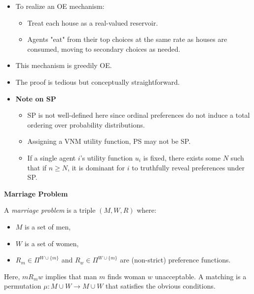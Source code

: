 \documentclass[8pt]{scrartcl}
\renewcommand{\section}[1]{\begin{center}\textbf{\color{red}#1}\end{center}}
\begin{document}
\begin{multicols*}{2}
\begin{itemize}
    \item To realize an OE mechanism:
    \begin{itemize}
        \item Treat each house as a real-valued reservoir.
        \item Agents "eat" from their top choices at the same rate as houses are consumed, moving to secondary choices as needed.
    \end{itemize}
    \item This mechanism is greedily OE.
    \item The proof is tedious but conceptually straightforward.
    \item \textbf{Note on SP}
    \begin{itemize}
        \item SP is not well-defined here since ordinal preferences do not induce a total ordering over probability distributions.
        \item Assigning a VNM utility function, PS may not be SP.
        \item If a single agent $i$'s utility function $u_i$ is fixed, there exists some $N$ such that if $n\geq N$, it is dominant for $i$ to truthfully reveal preferences under SP.
    \end{itemize}
\end{itemize}

\section{Marriage Problem}

A \textit{marriage problem} is a triple $(M, W, R)$ where:
\begin{itemize}
    \item $M$ is a set of men,
    \item $W$ is a set of women,
    \item $R_m \in \Pi^{W \cup \{m\}}$ and $R_w \in \Pi^{W \cup \{m\}}$ are (non-strict) preference functions.
\end{itemize}

Here, $m R_m w$ implies that man $m$ finds woman $w$ unacceptable. A matching is a permutation $\mu: M \cup W \to M \cup W$ that satisfies the obvious conditions.


\end{multicols*}
\end{document}
